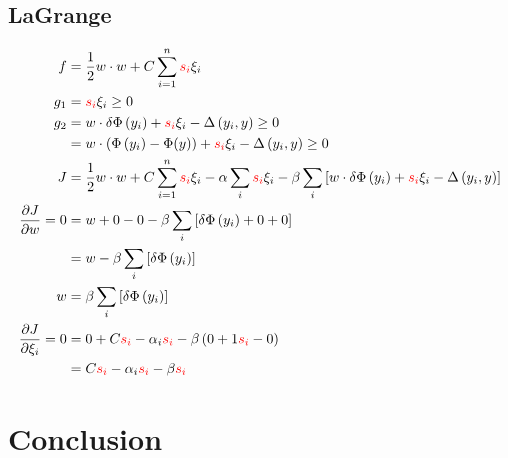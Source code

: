 \documentclass{IEEEtran}
\begin{document}
\subsection{LaGrange}
\begin{align}
    f &= \frac{1}{2} w \cdot w + C \sum_{i=1}^n \textcolor{red}{s_i} \xi_i \\
    g_1 &= \textcolor{red}{s_i} \xi_i \ge 0 \\
    g_2 &= w \cdot \delta \Phi\left(y_i\right) + \textcolor{red}{s_i} \xi_i - \Delta\left(y_i, y\right) \ge 0 \\
    &= w \cdot \left(\Phi\left(y_i\right) - \Phi(y)\right) + \textcolor{red}{s_i} \xi_i - \Delta\left(y_i, y\right) \ge 0 \nonumber \\
    J &= \frac{1}{2} w \cdot w + C \sum_{i=1}^n \textcolor{red}{s_i} \xi_i -
    \alpha \sum_i \textcolor{red}{s_i} \xi_i -
    \beta \sum_i \left[w \cdot \delta \Phi\left(y_i\right) + \textcolor{red}{s_i} \xi_i - \Delta\left(y_i,
    y\right)\right] \\
    \frac{\partial J}{\partial w} = 0 &= w + 0 - 0 - \beta \sum_i \left[\delta \Phi\left(y_i\right) + 0 + 0\right] \\
    &= w - \beta \sum_i \left[\delta \Phi\left(y_i\right)\right] \nonumber \\
    w &= \beta \sum_i \left[\delta \Phi\left(y_i\right)\right] \nonumber \\
    \frac{\partial J}{\partial \xi_i} = 0 &= 0 + C \textcolor{red}{s_i} - \alpha_i \textcolor{red}{s_i}
    - \beta \left(0 + 1 \textcolor{red}{s_i} - 0\right) \\
    &= C \textcolor{red}{s_i} - \alpha_i \textcolor{red}{s_i} - \beta \textcolor{red}{s_i} \nonumber
\end{align}
\section{Conclusion}



\end{document}
